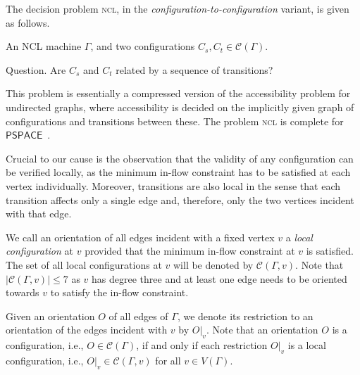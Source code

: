 \documentclass[anonymous,letter,UKenglish,cleveref,autoref,thm-restate]{lipics-v2021}
\makeatletter
\renewcommand{\leq}{\leqslant}
\newcommand{\PSPACE}{\ensuremath{\mathsf{PSPACE}}\xspace}
\newcommand{\cC}{\mathcal{C}}
\theoremstyle{plain}
\theoremstyle{plain}
\providecommand\iitem{}
\providecommand\qitem{}
\newcommand\decproblem@iitem@label{\rlap{Input.}\phantom{Question.}}
\newcommand\decproblem@qitem@label{Question.}
\newenvironment{decproblem}{\begin{description}\begin{samepage}\renewcommand{\iitem}{\item[\decproblem@iitem@label]}\renewcommand{\qitem}{\item[\decproblem@qitem@label]}}{\end{samepage}\end{description}}
\newcommand{\prob}[1]{\textup{\textsc{#1}}\xspace}
\newcommand{\dNCL}{\prob{ncl}}
\makeatother
\begin{document}
The decision problem \dNCL, in the \emph{configuration-to-configuration} variant, is given as follows.

\begin{decproblem}
  \iitem An NCL machine $\Gamma$, and two configurations $C_s, C_t \in \cC(\Gamma)$.
  \qitem Are $C_s$ and $C_t$ related by a sequence of transitions?
\end{decproblem}

This problem is essentially a compressed version of the accessibility problem for undirected graphs, where accessibility is decided on the implicitly given graph of configurations and transitions between these.
The problem \dNCL{} is complete for \PSPACE{}~\cite[Theorem 5]{HearnD05}.

Crucial to our cause is the observation that the validity of any configuration can be verified locally, as the minimum in-flow constraint has to be satisfied at each vertex individually. 
Moreover, transitions are also local in the sense that each transition affects only a single edge and, therefore, only the two vertices incident with that edge.

We call an orientation of all edges incident with a fixed vertex $v$ a \emph{local configuration} at $v$ provided that the minimum in-flow constraint at $v$ is satisfied.
The set of all local configurations at $v$ will be denoted by $\cC(\Gamma, v)$.
Note that $\lvert \cC(\Gamma, v) \rvert \leq 7$ as $v$ has degree three and at least one edge needs to be oriented towards $v$ to satisfy the in-flow constraint.

Given an orientation $O$ of all edges of $\Gamma$, we denote its restriction to an orientation of the edges incident with $v$ by $O\vert_v$.
Note that an orientation $O$ is a configuration, i.e., $O \in \cC(\Gamma)$, if and only if each restriction $O\vert_v$ is a local configuration, i.e., $O\vert_v \in \cC(\Gamma, v)$ for all $v \in V(\Gamma)$.
\end{document}
